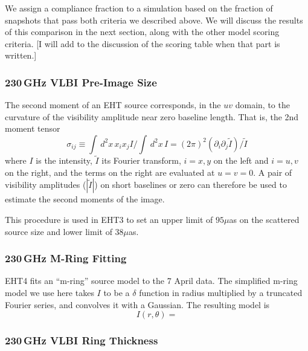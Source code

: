 We assign a compliance fraction to a simulation based on the fraction
of snapshots that pass both criteria we described above.
We will discuss the results of this comparison in the next section,
along with the other model scoring criteria.
[I will add to the discussion of the scoring table when that part is
  written.]

\subsubsection{230\,GHz VLBI Pre-Image Size}


The second moment of an EHT source corresponds, in the $uv$ domain, to the curvature of the visibility amplitude near zero baseline length.  That is, the 2nd moment tensor
\begin{equation}
    \sigma_{ij} \equiv \int \, d^2x\, x_i x_j I/\int \, d^2x \, I = (2\pi)^2 \left(\partial_i \partial_j \tilde{I}\right)/\tilde{I}
\end{equation}
where $I$ is the intensity, $\tilde{I}$ its Fourier transform, $i = x,y$ on the left and $i = u,v$ on the right, and the terms on the right are evaluated at $u = v = 0$.  A pair of visibility amplitudes ($|\tilde{I}|$) on short baselines or zero can therefore be used to estimate the second moments of the image.

This procedure is used in EHT3 to set an upper limit of $95\mu$as on the scattered source size and lower limit of $38\mu$as.

\subsubsection{230\,GHz M-Ring Fitting}

EHT4 fits an ``m-ring'' source model to the 7 April data.  The simplified m-ring model we use here takes $I$ to be a $\delta$ function in radius multiplied by a truncated Fourier series, and convolves it with a Gaussian.  The resulting model is
\begin{equation}
    I(r,\theta) =
\end{equation}

\subsubsection{230\,GHz VLBI Ring Thickness}

